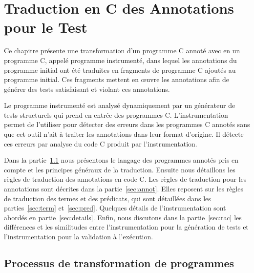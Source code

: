 
\chapter{Traduction en C des Annotations pour le Test}
\label{sec:traduction}

\chapterintro


Ce chapitre présente une transformation d'un programme C annoté avec \eacsl en
un programme C, appelé programme instrumenté, dans lequel les annotations
\eacsl du programme initial ont été traduites en fragments de programme C
ajoutés au programme initial.
Ces fragments mettent en \oe{}uvre les annotations \eacsl afin de générer des
tests satisfaisant et violant ces annotations.

Le programme instrumenté est analysé dynamiquement par un générateur de tests
structurels qui prend en entrée des programmes C.
L'instrumentation permet de l'utiliser pour détecter des erreurs dans les
programmes C annotés sans que cet outil n'ait à traiter les annotations dans
leur format d'origine.
Il détecte ces erreurs par analyse du code C produit par l'instrumentation.

Dans la partie~\ref{sec:process} nous présentons le langage des programmes
annotés pris en compte et les principes généraux de la traduction.
Ensuite nous détaillons les règles de traduction des annotations \eacsl en code
C.
Les règles de traduction pour les annotations sont décrites dans la
partie~\ref{sec:annot}.
Elles reposent sur les règles de traduction des termes et des prédicats, qui
sont détaillées dans les parties~\ref{sec:term} et~\ref{sec:pred}.
Quelques détails de l'instrumentation sont abordés en partie~\ref{sec:details}.
Enfin, nous discutons dans la partie~\ref{sec:rac} les différences et les
similitudes entre l'instrumentation pour la génération de tests et
l'instrumentation pour la validation à l'exécution.


\section{Processus de transformation de programmes}
\label{sec:process}




